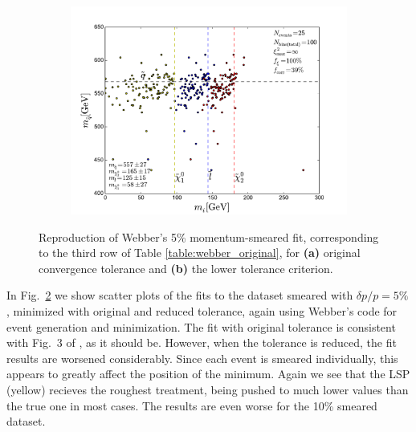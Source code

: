 \documentclass[twoside,english]{uiofysmaster}
\begin{document}
\begin{figure}[hbtp!]
	\begin{subfigure}[b]{0.8\textwidth}
		\includegraphics[width=\textwidth]{figures/webber_rec_table/webber_HW-rec_OFL_minuit-minimizer_lowtol_5pmomsmear_nocut.pdf}
		\caption{ } 
  \label{fig:webber_rec_scatter_tolerance-comparison_5pmomsmear_b}
	\end{subfigure}
	\caption{Reproduction of Webber's 5\% momentum-smeared fit, corresponding to the third row of Table \ref{table:webber_original}, for {\bf (a)} original convergence tolerance and {\bf (b)} the lower tolerance criterion.}
	\label{fig:webber_rec_scatter_tolerance-comparison_5pmomsmear}
\end{figure} 
In Fig.\ \ref{fig:webber_rec_scatter_tolerance-comparison_5pmomsmear} we show scatter plots of the fits to the dataset smeared with $\delta p/p = 5\%$, minimized with original and reduced tolerance, again using Webber's code for event generation and minimization. The fit with original tolerance is consistent with Fig.\ 3 of \cite{Webber:2009vm}, as it should be. However, when the tolerance is reduced, the fit results are worsened considerably. Since each event is smeared individually, this appears to greatly affect the position of the minimum. Again we see that the LSP (yellow) recieves the roughest treatment, being pushed to much lower values than the true one in most cases. The results are even worse for the 10\% smeared dataset. 
\end{document}
